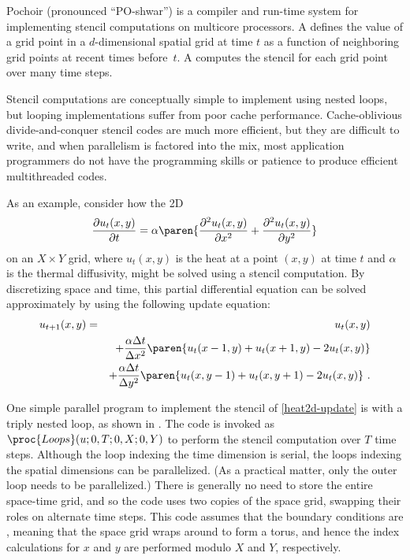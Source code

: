 
Pochoir (pronounced ``PO-shwar'') is a compiler and run-time system
for implementing stencil computations on multicore processors.  A
 defines the value of a grid point in a $d$-dimensional
spatial grid at time $t$ as a function of neighboring grid points at
recent times before~$t$.  A 
\cite{FrigoSt05, FrigoSt09, DattaMuVo08, KamilShDa06, KamilShHu05,
  Nitsure06, KrishnamoorthyBaBo07, DursunNoWa09, PengSeNo09,
  DursunNoPe09, BleckRoDi92, NakanoKaVa92, TafloveHa00, WilliamsCaOl08
} computes the stencil for each grid point over many time steps.

Stencil computations are conceptually simple to implement using nested
loops, but looping implementations suffer from poor cache performance.
Cache-oblivious \cite{FrigoLePr99,Prokop99} divide-and-conquer stencil
codes \cite{FrigoSt05, FrigoSt09} are much more efficient, but they
are difficult to write, and when parallelism is factored into the mix,
most application programmers do not have the programming skills or
patience to produce efficient multithreaded codes.

As an example, consider how the 2D
 \cite{Epperson07}
\begin{equation}
  \frac{\partial u_t(x,y)}{\partial t} 
    = \alpha \paren{\frac{\partial^2 u_t(x,y)}{ \partial x^2} 
      + \frac{\partial^2 u_t(x,y)}{ \partial y^2}}
      \label{eq:heat2d}
\end{equation}
on an $X\times Y$ grid, where $u_t(x,y)$ is the heat at a point
$(x,y)$ at time $t$ and $\alpha$ is the thermal diffusivity, might be
solved using a stencil computation.  By discretizing space and time,
this partial differential equation can be solved approximately by
using the following update equation:
\begin{eqnarray}
  u_{t+1}(x,y)  & = & u_t(x,y) \nonumber\\
  & & +  \frac{\alpha \Delta t}{\Delta x^2}
  \paren{ u_t(x-1,y) + u_t(x+1,y) - 2 u_t(x,y)}\nonumber \\
  & &  + \frac{\alpha \Delta t}{\Delta y^2} 
  \paren{u_t(x,y-1) + u_t(x,y+1) - 2u_t(x,y)} \ .
  \label{eq:heat2d-update}
\end{eqnarray}
  
One simple parallel program to implement the stencil of
\eqref{heat2d-update} is with a triply nested loop, as shown in
.  The code is invoked as $\proc{Loops}(u; 0, T; 0,
X; 0, Y)$ to perform the stencil computation over $T$ time steps.
Although the loop indexing the time dimension is serial, the loops
indexing the spatial dimensions can be parallelized.  (As a practical
matter, only the outer loop needs to be parallelized.)  There is
generally no need to store the entire space-time grid, and so the code
uses two copies of the space grid, swapping their roles on alternate
time steps.  This code assumes that the boundary conditions are
, meaning that the space grid wraps around to form a
torus, and hence the index calculations for $x$ and $y$ are performed
modulo $X$ and $Y$, respectively.

